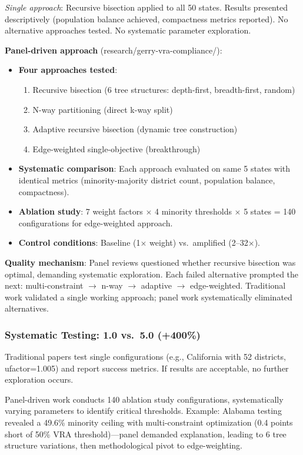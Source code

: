 \textit{Single approach}: Recursive bisection applied to all 50 states. Results presented descriptively (population balance achieved, compactness metrics reported). No alternative approaches tested. No systematic parameter exploration.

\textbf{Panel-driven approach} (research/gerry-vra-compliance/):

\begin{itemize}[leftmargin=*]
\item \textbf{Four approaches tested}:
  \begin{enumerate}
  \item Recursive bisection (6 tree structures: depth-first, breadth-first, random)
  \item N-way partitioning (direct k-way split)
  \item Adaptive recursive bisection (dynamic tree construction)
  \item Edge-weighted single-objective (breakthrough)
  \end{enumerate}
\item \textbf{Systematic comparison}: Each approach evaluated on same 5 states with identical metrics (minority-majority district count, population balance, compactness).
\item \textbf{Ablation study}: 7 weight factors $\times$ 4 minority thresholds $\times$ 5 states = 140 configurations for edge-weighted approach.
\item \textbf{Control conditions}: Baseline (1$\times$ weight) vs.\ amplified (2--32$\times$).
\end{itemize}

\textbf{Quality mechanism}: Panel reviews questioned whether recursive bisection was optimal, demanding systematic exploration. Each failed alternative prompted the next: multi-constraint $\to$ n-way $\to$ adaptive $\to$ edge-weighted. Traditional work validated a single working approach; panel work systematically eliminated alternatives.

\subsubsection{Systematic Testing: 1.0 vs.\ 5.0 (+400\%)}

Traditional papers test single configurations (e.g., California with 52 districts, ufactor=1.005) and report success metrics. If results are acceptable, no further exploration occurs.

Panel-driven work conducts 140 ablation study configurations, systematically varying parameters to identify critical thresholds. Example: Alabama testing revealed a 49.6\% minority ceiling with multi-constraint optimization (0.4 points short of 50\% VRA threshold)---panel demanded explanation, leading to 6 tree structure variations, then methodological pivot to edge-weighting.


